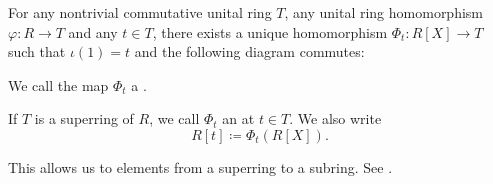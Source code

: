 \begin{proposition}\label{thm:polynomial_ring_universal_property}\mcite\cite[150]{Knapp2016BasicAlgebra}
  For any nontrivial commutative unital ring \( T \), any unital ring homomorphism \( \varphi: R \to T \) and any \( t \in T \), there exists a unique homomorphism \( \Phi_t: R[X] \to T \) such that \( \iota(1) = t \) and the following diagram commutes:

  \begin{alignedeq}\label{thm:polynomial_ring_universal_property/diagram}
    \iffalse\begin{mplibcode}
      beginfig(1);
      input metapost/graphs;

      v1 := thelabel("$R$", origin);
      v2 := thelabel("$R[X]$", (2, 0) scaled u);
      v3 := thelabel("$T$", (1, -1) scaled u);

      a1 := straight_arc(v1, v2);
      a2 := straight_arc(v1, v3);

      d1 := straight_arc(v2, v3);

      draw_vertices(v);
      draw_arcs(a);
      drawarrow d1 dotted;

      label.top("$\iota$", straight_arc_midpoint of a1);
      label.llft("$\varphi$", straight_arc_midpoint of a2);
      label.lrt("$\Phi_t$", straight_arc_midpoint of d1);
      endfig;
    \end{mplibcode}\fi
  \end{alignedeq}

  We call the map \( \Phi_t \) a .

  If \( T \) is a superring of \( R \), we call \( \Phi_t \) an  at \( t \in T \). We also write
  \begin{equation}
    R[t] \coloneqq \Phi_t(R[X]).
  \end{equation}

  This allows us to  elements from a superring to a subring. See .
\end{proposition}
